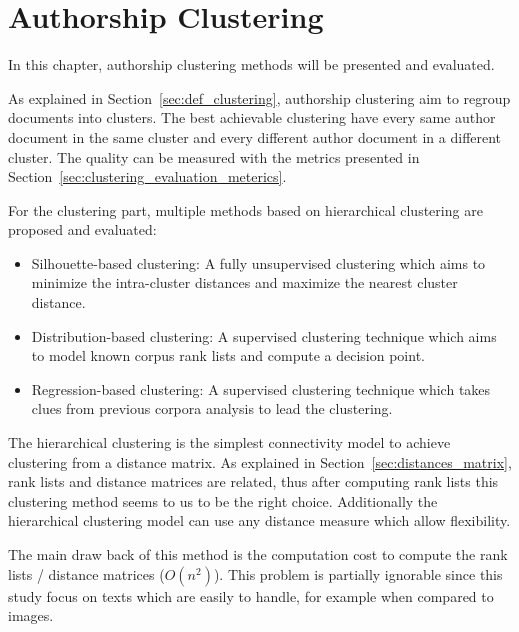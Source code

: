 \chapter{Authorship Clustering \label{sec:clustering}}

In this chapter, authorship clustering methods will be presented and evaluated.

As explained in Section~\ref{sec:def_clustering}, authorship clustering aim to regroup documents into clusters.
The best achievable clustering have every same author document in the same cluster and every different author document in a different cluster.
The quality can be measured with the metrics presented in Section~\ref{sec:clustering_evaluation_meterics}.

For the clustering part, multiple methods based on hierarchical clustering are proposed and evaluated:
\begin{itemize}
  \item
  Silhouette-based clustering: A fully unsupervised clustering which aims to minimize the intra-cluster distances and maximize the nearest cluster distance.
  \item
  Distribution-based clustering: A supervised clustering technique which aims to model known corpus rank lists and compute a decision point.
  \item
  Regression-based clustering: A supervised clustering technique which takes clues from previous corpora analysis to lead the clustering.
\end{itemize}

The hierarchical clustering is the simplest connectivity model to achieve clustering from a distance matrix.
As explained in Section~\ref{sec:distances_matrix}, rank lists and distance matrices are related, thus after computing rank lists this clustering method seems to us to be the right choice.
Additionally the hierarchical clustering model can use any distance measure which allow flexibility.

The main draw back of this method is the computation cost to compute the rank lists / distance matrices ($O(n^2)$).
This problem is partially ignorable since this study focus on texts which are easily to handle, for example when compared to images.






